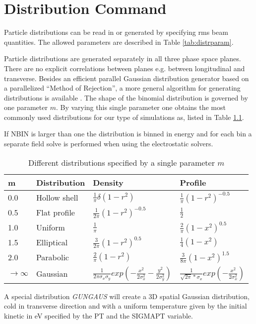 \chapter{Distribution Command}
\label{sec:distribution}
Particle distributions can be read in or generated by specifying rms beam quantities.
The allowed parameters are described in Table \ref{tab:distrparam}.

Particle distributions are generated separately in all three phase space planes.
There are no explicit correlations between planes e.g. between longitudinal and transverse.
Besides an efficient parallel Gaussian distribution generator based on a parallelized 
``Method of Rejection'',
a more general algorithm for generating
distributions is available \cite{JohoDist}. The shape of the binomial distribution is governed by
one parameter $m$. By varying this single parameter one obtains the most commonly 
used distributions for our
type of simulations as, listed in Table \ref{tab:binomdist}.

If NBIN is larger than one the distribution is binned in energy and for each bin a separate field solve is
performed when using the electrostatic solvers.
 
\begin{table}[h!]
\begin{flushleft} \footnotesize
 \begin{tabular}{|l|l|l|l|}
\hline
\bf m & \bf Distribution & \bf Density & \bf Profile \\
\hline
0.0 & Hollow shell  & $\frac{1}{\pi}\delta(1-r^2)$ &$\frac{1}{\pi}(1-r^2)^{-0.5}$\\
\hline
0.5 & Flat profile  & $\frac{1}{2\pi}(1-r^2)^{-0.5}$ & $\frac{1}{2}$\\
\hline
1.0 & Uniform  & $\frac{1}{\pi}$ & $\frac{2}{\pi}(1-x^2)^{0.5}$\\
\hline
1.5 & Elliptical  & $\frac{3}{2\pi}(1-r^2)^{0.5}$ & $\frac{1}{4}(1-x^2)$ \\
\hline
2.0 & Parabolic  & $\frac{2}{\pi}(1-r^2)$ & $\frac{3}{8\pi}(1-x^2)^{1.5}$ \\
\hline
$\rightarrow \infty$ & Gaussian  & $\frac{1}{2\pi\sigma_x\sigma_y}exp(-\frac{x^2}{2\sigma_x^2} -\frac{y^2}{2\sigma_y^2})$ & 
                       $\frac{1}{\sqrt{2\pi}*\sigma_x}exp(-\frac{x^2}{2\sigma_x^2}) $ \\
\hline
\end{tabular}
\end{flushleft} 
\caption{\label{tab:binomdist}{Different distributions specified by a single parameter $m$}}
\end{table}
A special distribution {\it GUNGAUS} will create a 3D spatial Gaussian distribution, cold in
transverse direction and with a uniform temperature given by the initial kinetic in eV specified by
the PT and the SIGMAPT variable.

